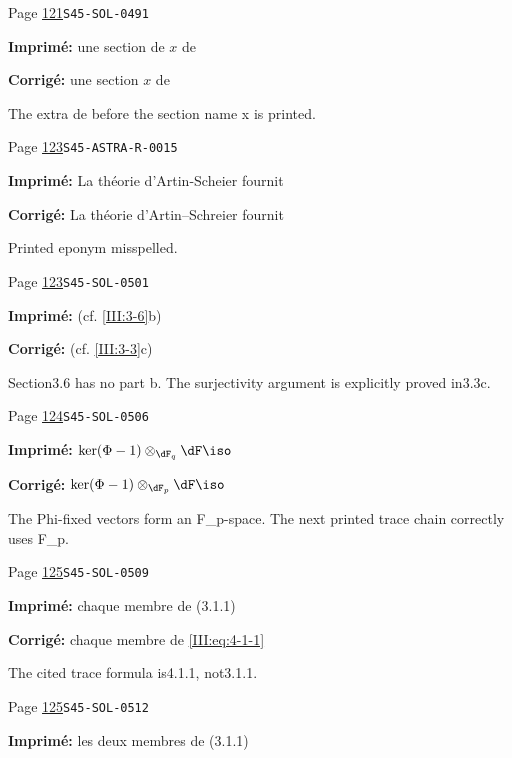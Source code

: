 \begin{description}
\smallskip
\item[\hypertarget{apparatus:FR-0080}{80}] Page \hyperlink{printpage:fr:121}{121}\quad\texttt{S45-SOL-0491}
\par\noindent\textbf{Imprimé:} une section de $x$ de
\par\noindent\textbf{Corrigé:} une section $x$ de
\par\noindent The extra de before the section name x is printed.
\smallskip
\item[\hypertarget{apparatus:FR-0081}{81}] Page \hyperlink{printpage:fr:123}{123}\quad\texttt{S45-ASTRA-R-0015}
\par\noindent\textbf{Imprimé:} La théorie d'Artin-Scheier fournit
\par\noindent\textbf{Corrigé:} La théorie d'Artin--Schreier fournit
\par\noindent Printed eponym misspelled.
\smallskip
\item[\hypertarget{apparatus:FR-0082}{82}] Page \hyperlink{printpage:fr:123}{123}\quad\texttt{S45-SOL-0501}
\par\noindent\textbf{Imprimé:} (cf. \ref{III:3-6}b)
\par\noindent\textbf{Corrigé:} (cf. \ref{III:3-3}c)
\par\noindent Section3.6 has no part b. The surjectivity argument is explicitly proved in3.3c.
\smallskip
\item[\hypertarget{apparatus:FR-0083}{83}] Page \hyperlink{printpage:fr:124}{124}\quad\texttt{S45-SOL-0506}
\par\noindent\textbf{Imprimé:} \(\ker(\Phi-1)\otimes_{\dF_q}\dF \iso\)
\par\noindent\textbf{Corrigé:} \(\ker(\Phi-1)\otimes_{\dF_p}\dF \iso\)
\par\noindent The Phi-fixed vectors form an F\_p-space. The next printed trace chain correctly uses F\_p.
\smallskip
\item[\hypertarget{apparatus:FR-0084}{84}] Page \hyperlink{printpage:fr:125}{125}\quad\texttt{S45-SOL-0509}
\par\noindent\textbf{Imprimé:} chaque membre de (3.1.1)
\par\noindent\textbf{Corrigé:} chaque membre de \eqref{III:eq:4-1-1}
\par\noindent The cited trace formula is4.1.1, not3.1.1.
\smallskip
\item[\hypertarget{apparatus:FR-0085}{85}] Page \hyperlink{printpage:fr:125}{125}\quad\texttt{S45-SOL-0512}
\par\noindent\textbf{Imprimé:} les deux membres de (3.1.1)

\end{description}
